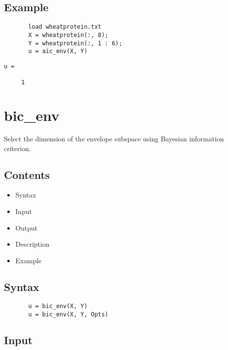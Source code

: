 \documentclass[a4paper,11pt,openany]{memoir}
\begin{document}
\subsection*{Example}


\begin{verbatim}       load wheatprotein.txt
       X = wheatprotein(:, 8);
       Y = wheatprotein(:, 1 : 6);
       u = aic_env(X, Y)\end{verbatim}
    
        \color{lightgray}\ttfamily \begin{verbatim}
u =

     1

\end{verbatim} \rmfamily
\color{black}
    
 

\newpage

\rmfamily
\color{black}\section{bic\_env}

\begin{par}
Select the dimension of the envelope subspace using Bayesian information criterion.
\end{par} \vspace{1em}

\subsection*{Contents}

\begin{itemize}
\setlength{\itemsep}{-1ex}
   \item Syntax
   \item Input
   \item Output
   \item Description
   \item Example
\end{itemize}


\subsection*{Syntax}


\begin{verbatim}       u = bic_env(X, Y)
       u = bic_env(X, Y, Opts)\end{verbatim}
    

\subsection*{Input}
\end{document}
